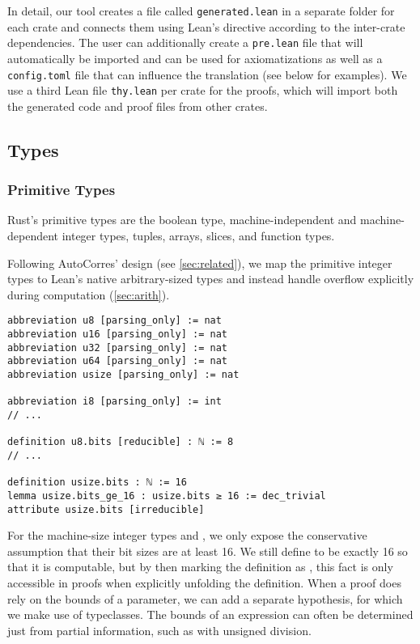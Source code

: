 In detail, our tool creates a file called \verb!generated.lean! in a separate
folder for each crate and connects them using Lean's  directive
according to the inter-crate dependencies. The user can additionally create a
\verb!pre.lean! file that will automatically be imported and can be used for
axiomatizations as well as a \verb!config.toml! file that can influence the
translation (see below for examples). We use a third Lean file \verb!thy.lean! per crate
for the proofs, which will import both the generated code and proof files from
other crates.

\subsection{Types}

\subsubsection{Primitive Types}
\label{sec:prim}

Rust's primitive types are the boolean type, machine-independent and machine-dependent integer
types, tuples, arrays, slices, and function types.

Following AutoCorres' design (see \autoref{sec:related}), we map the primitive integer types to
Lean's native arbitrary-sized types and instead handle overflow explicitly
during computation (\autoref{sec:arith}).

\begin{verbatim}
abbreviation u8 [parsing_only] := nat
abbreviation u16 [parsing_only] := nat
abbreviation u32 [parsing_only] := nat
abbreviation u64 [parsing_only] := nat
abbreviation usize [parsing_only] := nat

abbreviation i8 [parsing_only] := int
// ...

definition u8.bits [reducible] : ℕ := 8
// ...

definition usize.bits : ℕ := 16
lemma usize.bits_ge_16 : usize.bits ≥ 16 := dec_trivial
attribute usize.bits [irreducible]
\end{verbatim}

For the machine-size integer types  and , we only expose
the conservative assumption that their bit sizes are at least 16. We still define
 to be exactly 16 so that it is computable, but by then marking
the definition as \rust{[irreducible]}, this fact is only accessible in proofs
when explicitly unfolding the definition.
When a proof does rely on the bounds of a parameter, we can add a separate
hypothesis, for which we make use of typeclasses. The bounds of an expression
can often be determined just from partial information, such as with unsigned division.

